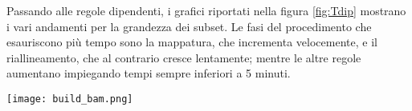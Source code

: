 Passando alle regole dipendenti, i grafici riportati nella figura \ref{fig:Tdip} mostrano i vari andamenti per la grandezza dei subset.
Le fasi del procedimento che esauriscono più tempo sono la mappatura, che incrementa velocemente, e il riallineamento, che al contrario cresce lentamente; mentre le altre regole aumentano impiegando tempi sempre inferiori a 5 minuti.
\begin{table}[H]
  \begin{minipage}[b]{0.4\linewidth}
	\centering
	\texttt{[image: build\_bam.png]}
	\label{subfig:BB}
  \end{minipage}
  \hfill 
  \begin{varwidth}[b]{0.4\linewidth}
    \centering
    \caption{Dettagli retta di fit per Build BAM.}
    \label{tab:Bb}
  \end{varwidth}%
\end{table}


